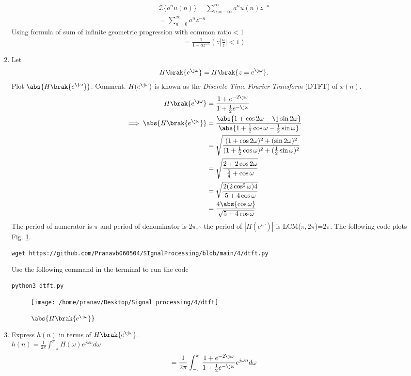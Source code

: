 \documentclass[journal,12pt,twocolumn]{IEEEtran}
\renewcommand\thesection{\arabic{section}}
\begin{document}
\begin{enumerate}[label=\thesection.\arabic*]
\begin{align}
{\mathcal {Z}}\{a^{n}u(n)\}=\sum_{n=-\infty}^{\infty} a^{n}u(n) z^{-n}\\
=\sum_{n=0}^{\infty}a^{n}z^{-n}
\end{align}
Using formula of  sum of infinite geometric progression with common ratio$<$1
\begin{align}
=\frac{1}{1-a z^{-1}} \left(\because \left|\frac{a}{z}\right|<1\right)
\end{align} 
\item 
Let
\begin{equation}
H\brak{e^{\j \omega}} = H\brak{z = e^{\j \omega}}.
\end{equation}
Plot $\abs{H\brak{e^{\j \omega}}}$.  Comment.  $H(e^{\j \omega})$ is
known as the {\em Discrete Time Fourier Transform} (DTFT) of $x(n)$.
\\
\solution
\begin{align}
		H\brak{e^{\j \omega}} &= \frac{1 + e^{-2\j\omega}}{1 + \frac12 e^{-\j\omega}} \\
		\implies \abs{H\brak{e^{\j \omega}}} &= \frac{\abs{1 + \cos2\omega - \j\sin2\omega}}{\abs{1 + \frac12 \cos\omega - \frac12 \sin\omega}} \\
		&= \sqrt{\frac{(1 + \cos2\omega)^2 + (\sin2\omega)^2}{(1 + \frac12 \cos\omega)^2 + (\frac12 \sin\omega)^2}} \\
		&= \sqrt{\frac{2 + 2\cos2\omega}{\frac54 + \cos\omega}} \\
		&= \sqrt{\frac{2(2\cos^2\omega)4}{5 + 4\cos\omega} } \\
		&= \frac{4\abs{\cos\omega}}{\sqrt{5 + 4\cos\omega}}
	\end{align} 
The period of numerator is $\pi$  and period of denominator is $2 \pi$,$\therefore$ the period of $|H(e^{i \omega})|$ is LCM($\pi,2 \pi$)=$2\pi$. The following code plots Fig. \ref{fig:dtft}.
\begin{lstlisting}
wget https://github.com/Pranavb060504/SIgnalProcessing/blob/main/4/dtft.py
\end{lstlisting}
Use the following command in the terminal to run the code
\begin{lstlisting}
python3 dtft.py
\end{lstlisting}
\begin{figure}[!ht]
\centering
\texttt{[image: /home/pranav/Desktop/Signal processing/4/dtft]}
\caption{$\abs{H\brak{e^{\j\omega}}}$}
\label{fig:dtft}
\end{figure}
\item Express $h(n)$ in terms of $H\brak{e^{\j \omega}}$.\\
\solution
$h(n)=\frac{1}{2 \pi} \int_{-\pi}^{\pi} H(\omega) e^{j \omega n} d \omega$\\
 \begin{align}
 =\frac{1}{2 \pi} \int_{-\pi}^{\pi} \frac{1 + e^{-2\j\omega}}{1 + \frac12 e^{-\j\omega}} e^{j \omega n} d\omega\\
 \end{align}
\end{enumerate}
\end{document}
